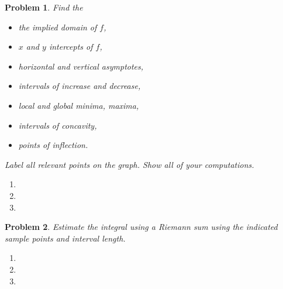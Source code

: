 \documentclass{article}
\renewcommand{\fcProblemRef}{\theproblem.\theenumi}
\newtheorem{problem}{Problem}
\begin{document}
\begin{problem}
Find the
\begin{multicols}{2}
\begin{itemize}
\item the implied domain of $f$,
\item $x$ and $y$ intercepts of $f$,
\item horizontal and vertical asymptotes,
\item intervals of increase and decrease,
\item local and global minima, maxima,
\item intervals of concavity,
\item points of inflection.
\end{itemize}
\end{multicols}
Label all relevant points on the graph. Show all of your computations.
\begin{enumerate}[ref={\fcProblemRef}]
\item 
\item 
\item 
\end{enumerate}
\end{problem}



\begin{problem}
Estimate the integral using a Riemann sum using the indicated sample points and interval length.
\begin{enumerate}[ref={\fcProblemRef}]
\item 
\item 
\item 
\end{enumerate}
\end{problem}

\end{document}
